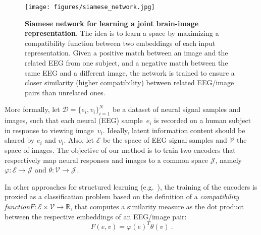 \documentclass[10pt,journal,compsoc,twocolumn]{IEEEtran}
\begin{document}
\begin{figure*}
	\centering
	\texttt{[image: figures/siamese\_network.jpg]}
	\caption{\textbf{Siamese network for learning a joint brain-image representation}. The idea is to learn a space by maximizing a compatibility function between two embeddings of each input representation. Given a positive match between an image and the related EEG from one subject, and a negative match between the same EEG and a different image, the network is trained to ensure a closer similarity (higher compatibility) between related EEG/image pairs than unrelated ones.}
	\label{fig:joint}
\end{figure*}

More formally, let $\mathcal{D} = \{ e_i, v_i\}_{i=1}^N$ be a dataset of neural signal samples and images, such that each neural (EEG) sample~$e_i$ is recorded on a human subject in response to viewing image~$v_i$. Ideally, latent information content should be shared by $e_i$ and $v_i$. Also, let $\mathcal{E}$ be the space of EEG signal samples and $\mathcal{V}$ the space of images. The objective of our method is to train two encoders that respectively map neural responses and images to a common space $\mathcal{J}$, namely $\varphi: \mathcal{E} \rightarrow \mathcal{J}$ and $\theta: \mathcal{V} \rightarrow \mathcal{J}$.

In other approaches for structured learning (e.g.~\cite{pmlr-v48-reed16}), the training of the encoders is proxied as a classification problem based on the definition of a \textit{compatibility function}$F: \mathcal{E} \times \mathcal{V} \rightarrow \mathbb{R}$, that computes a similarity measure as the dot product between the respective embeddings of an EEG/image pair:
\begin{equation}
 F(e,v) = \varphi(e)^T \theta(v)~.
 \label{eq:comp}
\end{equation}
\end{document}
